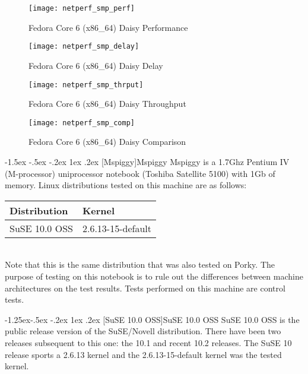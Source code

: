 \documentclass[letterpaper,final,notitlepage,twocolumn,10pt,twoside]{article}
\makeatletter
\renewcommand\subsection{\@startsection{subsection}{2}{\z@}%
                                     {-1.5ex \@plus -.5ex \@minus -.2ex}%
                                     {1ex \@plus .2ex}%
                                     {\normalfont\normalsize\bfseries}}
\renewcommand\subsubsection{\@startsection{subsubsection}{3}{\z@}%
                                     {-1.25ex\@plus -.5ex \@minus -.2ex}%
                                     {1ex \@plus .2ex}%
                                     {\normalfont\normalsize\bfseries}}
\makeatother
\begin{document}
\begin{figure}[p]
\center\texttt{[image: netperf\_smp\_perf]}
\caption[Fedora Core 6 (x86\_64) Daisy Performance]{Fedora Core 6 (x86\_64) Daisy Performance}
\label{figure:smpperf}
\end{figure}

\begin{figure}[p]
\center\texttt{[image: netperf\_smp\_delay]}
\caption[Fedora Core 6 (x86\_64) Daisy Delay]{Fedora Core 6 (x86\_64) Daisy Delay}
\label{figure:smpdly}
\end{figure}

\begin{figure}[p]
\center\texttt{[image: netperf\_smp\_thrput]}
\caption[Fedora Core 6 (x86\_64) Daisy Throughput]{Fedora Core 6 (x86\_64) Daisy Throughput}
\label{figure:smpthrput}
\end{figure}

\begin{figure}[p]
\center\texttt{[image: netperf\_smp\_comp]}
\caption[Fedora Core 6 (x86\_64) Daisy Comparison]{Fedora Core 6 (x86\_64) Daisy Comparison}
\label{figure:smpcomp}
\end{figure}

\subsection[Mspiggy]{Mspiggy}
Mspiggy is a 1.7Ghz Pentium IV (M-processor) uniprocessor notebook (Toshiba
Satellite 5100) with 1Gb of memory.  Linux distributions tested on this
machine are as follows:

\begin{tabular}{ll}\\
Distribution & Kernel\\
\hline
SuSE 10.0 OSS & 2.6.13-15-default\\
\end{tabular}\\[1.0ex]

Note that this is the same distribution that was also tested on Porky.  The
purpose of testing on this notebook is to rule out the differences between
machine architectures on the test results.  Tests performed on this machine
are control tests.

\subsubsection[SuSE 10.0 OSS]{SuSE 10.0 OSS}
SuSE 10.0 OSS is the public release version of the SuSE/Novell distribution.
There have been two releases subsequent to this one: the 10.1 and recent 10.2
releases.  The SuSE 10 release sports a 2.6.13 kernel and the
2.6.13-15-default kernel was the tested kernel.
\end{document}
